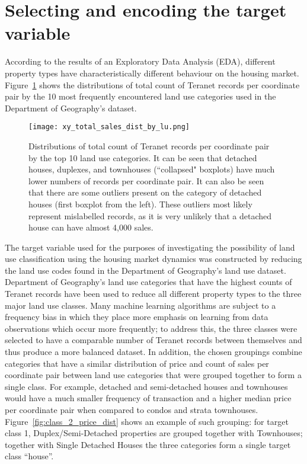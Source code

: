 \section{Selecting and encoding the target variable} \label{sec:select_encode_target}

According to the results of an Exploratory Data Analysis (EDA), different property types have characteristically different behaviour on the housing market.
Figure~\ref{fig:xy_total_sales_dist_by_lu} shows the distributions of total count of Teranet records per coordinate pair by the 10 most frequently encountered land use categories used in the Department of Geography's dataset.

\begin{figure}[hbt!]
    \centering
    \texttt{[image: xy\_total\_sales\_dist\_by\_lu.png]}
    \caption{Distributions of total count of Teranet records per coordinate pair by the top 10 land use categories.
    It can be seen that detached houses, duplexes, and townhouses (``collapsed" boxplots) have much lower numbers of records per coordinate pair.
    It can also be seen that there are some outliers present on the category of detached houses (first boxplot from the left).
    These outliers most likely represent mislabelled records, as it is very unlikely that a detached house can have almost 4,000 sales.}
    \label{fig:xy_total_sales_dist_by_lu}
\end{figure}

The target variable used for the purposes of investigating the possibility of land use classification using the housing market dynamics was constructed by reducing the land use codes found in the Department of Geography's land use dataset.
Department of Geography's land use categories that have the highest counts of Teranet records have been used to reduce all different property types to the three major land use classes.
Many machine learning algorithms are subject to a frequency bias in which they place more emphasis on learning from data observations which occur more frequently;
to address this, the three classes were selected to have a comparable number of Teranet records between themselves and thus produce a more balanced dataset.
In addition, the chosen groupings combine categories that have a similar distribution of price and count of sales per coordinate pair between land use categories that were grouped together to form a single class.
For example, detached and semi-detached houses and townhouses would have a much smaller frequency of transaction and a higher median price per coordinate pair when compared to condos and strata townhouses.
Figure~\ref{fig:class_2_price_dist} shows an example of such grouping: for target class 1, Duplex/Semi-Detached properties are grouped together with Townhouses;
together with Single Detached Houses the three categories form a single target class ``house''.


